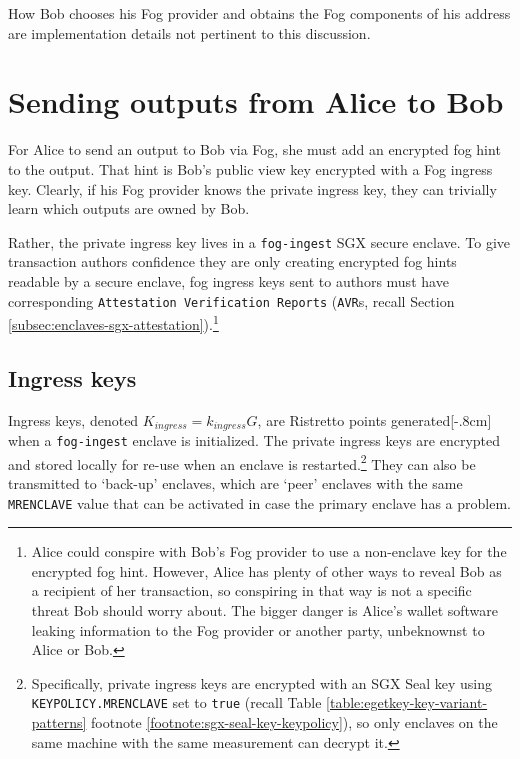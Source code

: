 How Bob chooses his Fog provider and obtains the Fog components of his address are implementation details not pertinent to this discussion.%



\section{Sending outputs from Alice to Bob}
\label{sec:fog-sending-outputs-alice-to-bob}

For Alice to send an output to Bob via Fog, she must add an encrypted fog hint to the output. That hint is Bob's public view key encrypted with a Fog ingress key. Clearly, if his Fog provider knows the private ingress key, they can trivially learn which outputs are owned by Bob.

Rather, the private ingress key lives in a {\tt fog-ingest} SGX secure enclave. To give transaction authors confidence they are only creating encrypted fog hints readable by a secure enclave, fog ingress keys sent to authors must have corresponding {\tt Attestation Verification Reports} ({\tt AVR}s, recall Section \ref{subsec:enclaves-sgx-attestation}).\footnote{Alice could conspire with Bob's Fog provider to use a non-enclave key for the encrypted fog hint. However, Alice has plenty of other ways to reveal Bob as a recipient of her transaction, so conspiring in that way is not a specific threat Bob should worry about. The bigger danger is Alice's wallet software leaking information to the Fog provider or another party, unbeknownst to Alice or Bob.}


\subsection{Ingress keys}
\label{subsec:fog-ingress-keys}

Ingress keys, denoted $K_{ingress} = k_{ingress} G$, are Ristretto points generated[-.8cm] when a {\tt fog-ingest} enclave is initialized. The private ingress keys are encrypted and stored locally for re-use when an enclave is restarted.\footnote{Specifically, private ingress keys are encrypted with an SGX Seal key using {\tt KEYPOLICY.MRENCLAVE} set to {\tt true} (recall Table \ref{table:egetkey-key-variant-patterns} footnote \ref{footnote:sgx-seal-key-keypolicy}), so only enclaves on the same machine with the same measurement can decrypt it.} They can also be transmitted to `back-up' enclaves, which are `peer' enclaves with the same {\tt MRENCLAVE} value that can be activated in case the primary enclave has a problem.%

